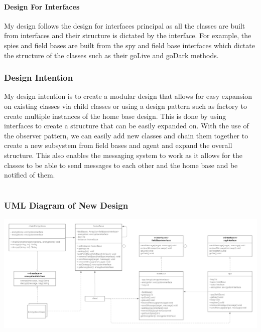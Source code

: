 \documentclass[12pt]{article}
\begin{document}
        \subsection*{Design For Interfaces}
            My design follows the design for interfaces principal as all the classes are built from interfaces and their structure is
            dictated by the interface. For example, the spies and field bases are built from the spy and field base interfaces
            which dictate the structure of the classes such as their goLive and goDark methods. 

    \section*{Design Intention}
        My design intention is to create a modular design that allows for easy expansion on existing classes via child classes or using 
        a design pattern such as factory to create multiple instances of the home base design. This is done by using interfaces
        to create a structure that can be easily expanded on. With the use of the observer pattern, we can easily add new classes and chain them together to create a new 
        subsystem from field bases and agent and expand the overall structure. This also enables the messaging system to work as it allows for the classes to
         be able to send messages to each other and the home base and be notified of them. 

    \part{}
    \section*{UML Diagram of New Design}
        \includegraphics[scale=.22]{part2_uml}
    
\end{document}

